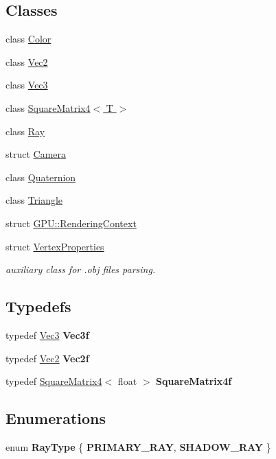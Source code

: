 \subsection*{Classes}
\begin{DoxyCompactItemize}
\item 
class \hyperlink{class_color}{Color}
\item 
class \hyperlink{class_vec2}{Vec2}
\item 
class \hyperlink{class_vec3}{Vec3}
\item 
class \hyperlink{class_square_matrix4}{Square\+Matrix4$<$ T $>$}
\item 
class \hyperlink{class_ray}{Ray}
\item 
struct \hyperlink{struct_camera}{Camera}
\item 
class \hyperlink{class_quaternion}{Quaternion}
\item 
class \hyperlink{class_triangle}{Triangle}
\item 
struct \hyperlink{struct_g_p_u_1_1_rendering_context}{G\+P\+U\+::\+Rendering\+Context}
\item 
struct \hyperlink{struct_vertex_properties}{Vertex\+Properties}
\begin{DoxyCompactList}\small\item\em auxiliary class for .obj files parsing. \end{DoxyCompactList}\end{DoxyCompactItemize}
\subsection*{Typedefs}
\begin{DoxyCompactItemize}
\item 
typedef \hyperlink{class_vec3}{Vec3} {\bfseries Vec3f}
\item 
typedef \hyperlink{class_vec2}{Vec2} {\bfseries Vec2f}
\item 
typedef \hyperlink{class_square_matrix4}{Square\+Matrix4}$<$ float $>$ {\bfseries Square\+Matrix4f}
\end{DoxyCompactItemize}
\subsection*{Enumerations}
\begin{DoxyCompactItemize}
\item 
enum {\bfseries Ray\+Type} \{ {\bfseries P\+R\+I\+M\+A\+R\+Y\+\_\+\+R\+AY}, 
{\bfseries S\+H\+A\+D\+O\+W\+\_\+\+R\+AY}
 \}\hypertarget{group__linear__algebra_ga1d5111b9fffd76014406e866c8784459}{}\label{group__linear__algebra_ga1d5111b9fffd76014406e866c8784459}

\end{DoxyCompactItemize}
